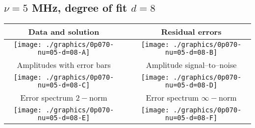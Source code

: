

% 

\clearpage{}
\break{}

\subsection{$\nu = 5$ MHz, degree of fit $d = 8$}

\begin{table}[h]
    \begin{center}
        \begin{tabular}{ccc}
            Data and solution & \quad & Residual errors \\\hline
            \texttt{[image: ./graphics/0p070-nu=05-d=08-A]} &&
            \texttt{[image: ./graphics/0p070-nu=05-d=08-B]} \\[15pt]
            Amplitudes with error bars && Amplitude signal--to--noise \\\hline
            \texttt{[image: ./graphics/0p070-nu=05-d=08-C]} &&
            \texttt{[image: ./graphics/0p070-nu=05-d=08-D]} \\[15pt]
            Error spectrum $2-$norm && Error spectrum $\infty-$norm \\\hline
            \texttt{[image: ./graphics/0p070-nu=05-d=08-E]} &&
            \texttt{[image: ./graphics/0p070-nu=05-d=08-F]} \\[15pt]
        \end{tabular}
    \end{center}
\label{fig:elev=70, nu=5}
\end{table}



\endinput
